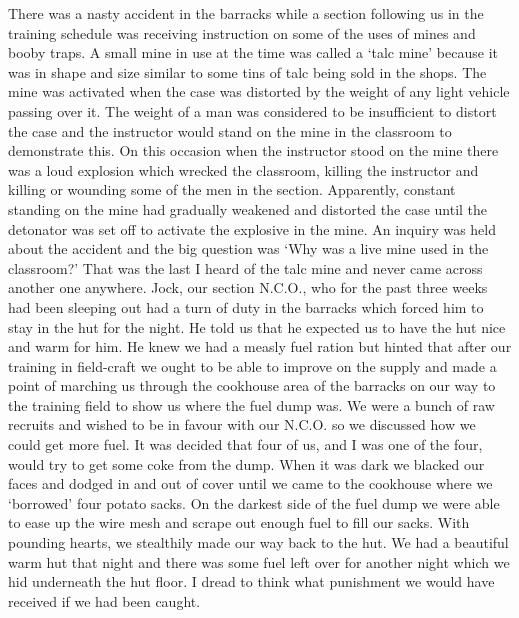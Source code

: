 There was a nasty accident in the barracks while a section following
us in the training schedule was receiving instruction on some of the
uses of mines and booby traps. A small mine in use at the time was
called a `talc mine' because it was in shape and size similar to some
tins of talc being sold in the shops. The mine was activated when the
case was distorted by the weight of any light vehicle passing over it.
The weight of a man was considered to be insufficient to distort the
case and the instructor would stand on the mine in the classroom to
demonstrate this. On this occasion when the instructor stood on the
mine there was a loud explosion which wrecked the classroom, killing
the instructor and killing or wounding some of the men in the section.
Apparently, constant standing on the mine had gradually weakened and
distorted the case until the detonator was set off to activate the
explosive in the mine. An inquiry was held about the accident and the
big question was `Why was a live mine used in the classroom?'  That
was the last I heard of the talc mine and never came across another
one anywhere. Jock, our section N.C.O., who for the past three weeks
had been sleeping out had a turn of duty in the barracks which forced
him to stay in the hut for the night. He told us that he expected us
to have the hut nice and warm for him. He knew we had a measly fuel
ration but hinted that after our training in field-craft we ought to be
able to improve on the supply and made a point of marching us through
the cookhouse area of the barracks on our way to the training field to
show us where the fuel dump was. We were a bunch of raw recruits and
wished to be in favour with our N.C.O. so we discussed how we could
get more fuel. It was decided that four of us, and I was one of the
four, would try to get some coke from the dump. When it was dark we
blacked our faces and dodged in and out of cover until we came to the
cookhouse where we `borrowed' four potato sacks. On the darkest side
of the fuel dump we were able to ease up the wire mesh and scrape out
enough fuel to fill our sacks. With pounding hearts, we stealthily
made our way back to the hut. We had a beautiful warm hut that night
and there was some fuel left over for another night which we hid
underneath the hut floor. I dread to think what punishment we would
have received if we had been caught.

